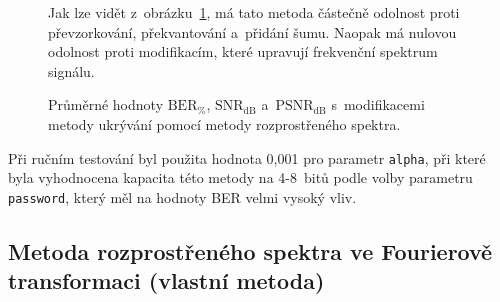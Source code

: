 \begin{figure}[hbt]
Jak lze vidět z~obrázku~\ref{pic:modifications-mean-values-dsss}, má tato
metoda částečně odolnost proti převzorkování, překvantování a~přidání šumu.
Naopak má nulovou odolnost proti modifikacím, které upravují frekvenční
spektrum signálu.

    \table
    \centering
    \caption{Průměrné hodnoty $\mathrm{BER}_{\%}$, $\mathrm{SNR}_\mathrm{dB}$
    a~$\mathrm{PSNR}_\mathrm{dB}$ s~modifikacemi metody ukrývání pomocí
    metody rozprostřeného spektra.}
    \label{pic:modifications-mean-values-dsss}
\end{figure}

Při ručním testování byl použita hodnota 0,001 pro parametr \texttt{alpha}, při
které byla vyhodnocena kapacita této metody na 4-8~bitů podle volby parametru
\texttt{password}, který měl na hodnoty BER velmi vysoký vliv.

\subsection*{Metoda rozprostřeného spektra ve Fourierově transformaci (vlastní
metoda)}

\blindtext

